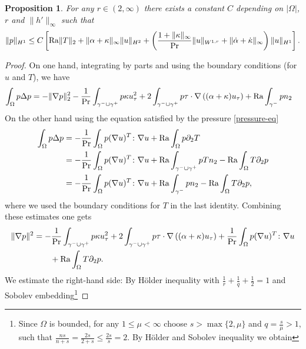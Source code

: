 \documentclass{article}
\newtheorem{proposition}[theorem]{Proposition}
\theoremstyle{definition}
\theoremstyle{definition}
\newcommand{\gplus}{\gamma^+}
\newcommand{\gminus}{\gamma^-}
\newcommand{\Pra}{\rm{Pr}}
\newcommand{\Ra}{{\rm{Ra}}}
\begin{document}
\begin{proposition}
\label{proposition-pressure-bound}
For any $r\in (2,\infty)$ there exists a constant $C$ depending on $|\Omega|$, $r$ and $\|h'\|_{\infty}$ such that
\begin{align*}
    \| p\|_{H^1}
    \leq C\left[ \Ra\|T\|_2 + \|\alpha+\kappa\|_\infty\|u\|_{H^2}+\left(\frac{1+\|\kappa\|_\infty}{\Pra}\|u\|_{W^{1,r}}+\|\dot\alpha+\dot\kappa\|_\infty \right)\|u\|_{H^1}\right].
\end{align*}

\end{proposition}

\begin{proof}
On one hand, integrating by parts and using the boundary conditions (for $u$ and $T$), we have 
\begin{align*}
    \int_{\Omega} p\Delta p 
    &= - \| \nabla p\|_2^2 - \frac{1}{\Pra} \int_{\gamma^-\cup\gamma^+} p\kappa u_\tau^2 +2\int_{\gamma^-\cup\gamma^+}p \tau\cdot \nabla\left((\alpha+\kappa)u_\tau\right)+\Ra\int_{\gamma^-} p n_2
\end{align*}
On the other hand using the equation satisfied by the pressure \eqref{pressure-eq}
\begin{align*}
    \int_{\Omega} p\Delta p 
     &= -\frac{1}{\Pra}\int_{\Omega} p(\nabla u)^T \colon \nabla u + \Ra \int_{\Omega} p\partial_2 T \\
     &= -\frac{1}{\Pra}\int_{\Omega} p(\nabla u)^T \colon \nabla u  + \Ra \int_{\gminus\cup\gplus} pT n_2- \Ra \int_{\Omega} T\partial_2 p\\
     &= -\frac{1}{\Pra}\int_{\Omega} p(\nabla u)^T \colon \nabla u + \Ra\int_{\gminus} pn_2- \Ra \int_{\Omega} T\partial_2 p,
\end{align*}
where we used the boundary conditions for $T$ in the last identity.
Combining these estimates one gets
\begin{align*}
     \| \nabla p\|^2 
     &= - \frac{1}{\Pra} \int_{\gamma^-\cup\gamma^+} p\kappa u_\tau^2 +2\int_{\gamma^-\cup\gamma^+}p \tau\cdot \nabla\left((\alpha+\kappa)u_\tau\right) +\frac{1}{\Pra}\int_{\Omega} p(\nabla u)^T \colon \nabla u
     \\&\qquad + \Ra \int_{\Omega} T\partial_2 p.
\end{align*}
We estimate the right-hand side:
By H\"older inequality with $\frac{1}{r}+\frac{1}{q}+\frac{1}{2}=1$ and Sobolev embedding\footnote{ Since $\Omega$ is bounded, for any $1\leq \mu<\infty$ choose $s>\max\lbrace 2,\mu \rbrace$ and $q=\frac{s}{\mu}>1$, such that $\frac{ns}{n+s}=\frac{2s}{2+s}\leq \frac{2s}{s}=2$. By H\"older and Sobolev inequality we obtain
}
\end{proof}
\end{document}
